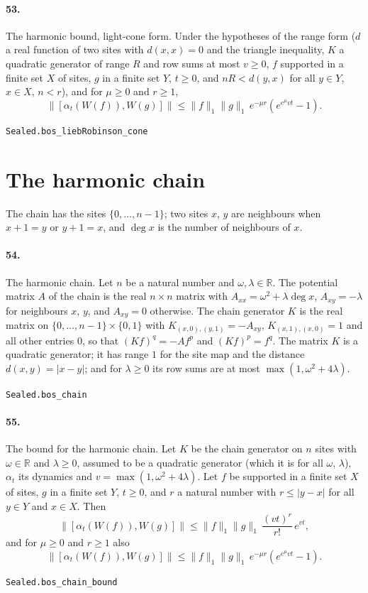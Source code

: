 \documentclass[11pt]{article}
\begin{document}
\paragraph{53.} The harmonic bound, light-cone form. Under the hypotheses of the range form ($d$ a real function of two sites with $d(x, x) = 0$ and the triangle inequality, $K$ a quadratic generator of range $R$ and row sums at most $v \ge 0$, $f$ supported in a finite set $X$ of sites, $g$ in a finite set $Y$, $t \ge 0$, and $n R < d(y, x)$ for all $y \in Y$, $x \in X$, $n < r$), and for $\mu \ge 0$ and $r \ge 1$, \[\|[\alpha_t(W(f)), W(g)]\| \le \|f\|_1 \|g\|_1\, e^{-\mu r} (e^{e^{\mu} v t} - 1).\]\par{\footnotesize\texttt{Sealed.bos\_liebRobinson\_cone}}

\section*{The harmonic chain}
The chain has the sites $\{0, \dots, n - 1\}$; two sites $x$, $y$ are neighbours when $x + 1 = y$ or $y + 1 = x$, and $\deg x$ is the number of neighbours of $x$.

\paragraph{54.} The harmonic chain. Let $n$ be a natural number and $\omega, \lambda \in \mathbb R$. The potential matrix $A$ of the chain is the real $n \times n$ matrix with $A_{xx} = \omega^2 + \lambda \deg x$, $A_{xy} = -\lambda$ for neighbours $x$, $y$, and $A_{xy} = 0$ otherwise. The chain generator $K$ is the real matrix on $\{0, \dots, n - 1\} \times \{0, 1\}$ with $K_{(x, 0), (y, 1)} = -A_{xy}$, $K_{(x, 1), (x, 0)} = 1$ and all other entries $0$, so that $(K f)^q = -A f^p$ and $(K f)^p = f^q$. The matrix $K$ is a quadratic generator; it has range $1$ for the site map and the distance $d(x, y) = |x - y|$; and for $\lambda \ge 0$ its row sums are at most $\max(1, \omega^2 + 4\lambda)$.\par{\footnotesize\texttt{Sealed.bos\_chain}}

\paragraph{55.} The bound for the harmonic chain. Let $K$ be the chain generator on $n$ sites with $\omega \in \mathbb R$ and $\lambda \ge 0$, assumed to be a quadratic generator (which it is for all $\omega$, $\lambda$), $\alpha_t$ its dynamics and $v = \max(1, \omega^2 + 4\lambda)$. Let $f$ be supported in a finite set $X$ of sites, $g$ in a finite set $Y$, $t \ge 0$, and $r$ a natural number with $r \le |y - x|$ for all $y \in Y$ and $x \in X$. Then \[\|[\alpha_t(W(f)), W(g)]\| \le \|f\|_1 \|g\|_1\, \frac{(vt)^r}{r!}\, e^{vt},\] and for $\mu \ge 0$ and $r \ge 1$ also \[\|[\alpha_t(W(f)), W(g)]\| \le \|f\|_1 \|g\|_1\, e^{-\mu r} (e^{e^{\mu} v t} - 1).\]\par{\footnotesize\texttt{Sealed.bos\_chain\_bound}}
\end{document}

